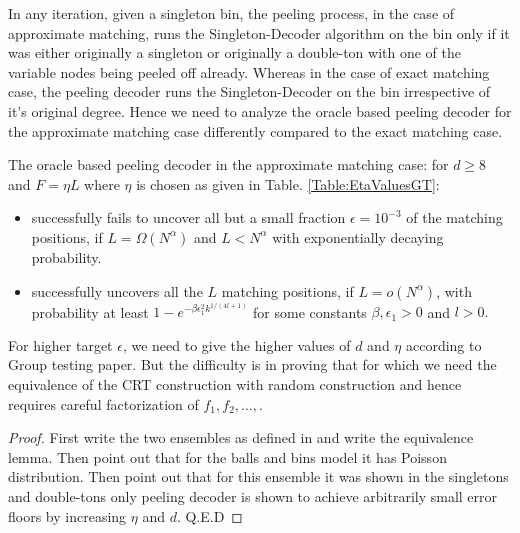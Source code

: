 In any iteration, given a singleton bin, the peeling process, in the case of approximate matching, runs the Singleton-Decoder algorithm on the bin only if it was either originally a singleton or originally a double-ton with one of the variable nodes being peeled off already. Whereas  in the case of exact matching case, the peeling decoder runs the Singleton-Decoder on the bin irrespective of it's original degree. Hence we need to analyze the oracle based peeling decoder for the approximate matching case differently compared to the exact matching case. 
\begin{lemma}
The oracle based peeling decoder in the approximate matching case: for $d\geq 8$ and $F=\eta L$ where $\eta$ is chosen as given in Table. \ref{Table:EtaValuesGT}:
\begin{itemize}
\item successfully fails to uncover all but a small fraction $\epsilon=10^{-3}$ of the matching positions, if $L=\Omega(N^{\alpha})$ and $L<N^{\alpha}$ with exponentially decaying probability.
\item successfully uncovers all the $L$ matching positions, if $L=o(N^{\alpha})$, with probability at least $1-e^{-\beta \epsilon_1^2k^{1/(4l+1)}}$ for some constants $\beta,\epsilon_1>0$ and $l>0.$
\end{itemize}
For higher target $\epsilon$, we need to give the higher values of $d$ and $\eta$ according to Group testing paper. But the difficulty is in proving that for which we need the equivalence of the CRT construction with random construction and hence requires careful factorization of $f_1,f_2,\ldots,$.
\end{lemma}
\begin{proof}
First write the two ensembles as defined in and write the equivalence lemma. Then point out that for the balls and bins model it has Poisson distribution. Then point out that for this ensemble it was shown in \cite{lee2015saffron} the singletons and double-tons only peeling decoder is shown to achieve arbitrarily small error floors by increasing $\eta$ and $d$. Q.E.D
\end{proof}